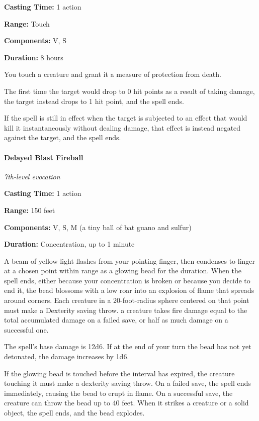 \documentclass[
]{article}
\begin{document}
\textbf{Casting Time:} 1 action

\textbf{Range:} Touch

\textbf{Components:} V, S

\textbf{Duration:} 8 hours

You touch a creature and grant it a measure of protection from death.

The first time the target would drop to 0 hit points as a result of
taking damage, the target instead drops to 1 hit point, and the spell
ends.

If the spell is still in effect when the target is subjected to an
effect that would kill it instantaneously without dealing damage, that
effect is instead negated against the target, and the spell ends.

\hypertarget{delayed-blast-fireball}{%
\paragraph{Delayed Blast Fireball}\label{delayed-blast-fireball}}

\emph{7th-level evocation}

\textbf{Casting Time:} 1 action

\textbf{Range:} 150 feet

\textbf{Components:} V, S, M (a tiny ball of bat guano and sulfur)

\textbf{Duration:} Concentration, up to 1 minute

A beam of yellow light flashes from your pointing finger, then condenses
to linger at a chosen point within range as a glowing bead for the
duration. When the spell ends, either because your concentration is
broken or because you decide to end it, the bead blossoms with a low
roar into an explosion of flame that spreads around corners. Each
creature in a 20-foot-radius sphere centered on that point must make a
Dexterity saving throw. a creature takes fire damage equal to the total
accumulated damage on a failed save, or half as much damage on a
successful one.

The spell's base damage is 12d6. If at the end of your turn the bead has
not yet detonated, the damage increases by 1d6.

If the glowing bead is touched before the interval has expired, the
creature touching it must make a dexterity saving throw. On a failed
save, the spell ends immediately, causing the bead to erupt in flame. On
a successful save, the creature can throw the bead up to 40 feet. When
it strikes a creature or a solid object, the spell ends, and the bead
explodes.
\end{document}
